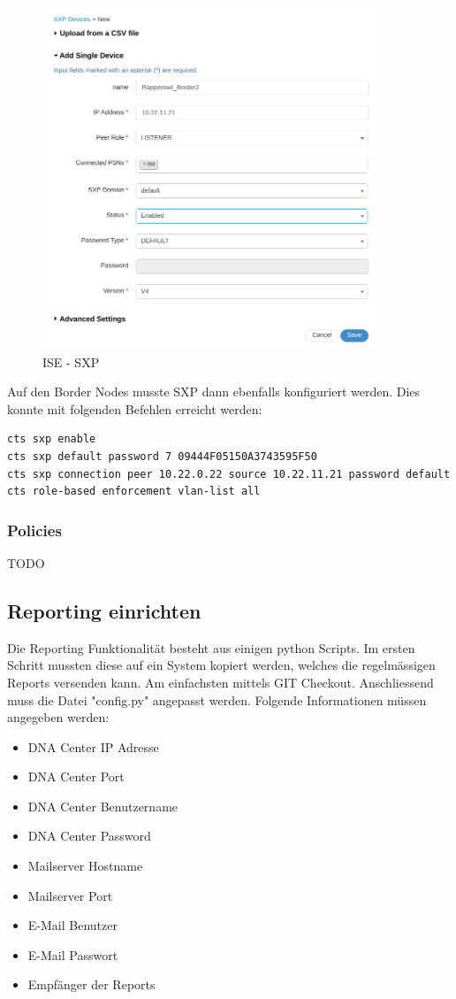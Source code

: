 \begin{figure}[H]
	\centering
	\includegraphics[width=10cm]{img/secondtry/ise-sxp.png}
	\caption{ISE - SXP}
	\label{fig:ise-sxp}
\end{figure}

Auf den Border Nodes musste SXP dann ebenfalls konfiguriert werden. Dies konnte mit folgenden Befehlen erreicht werden:
\begin{lstlisting}[language=bash]
cts sxp enable
cts sxp default password 7 09444F05150A3743595F50
cts sxp connection peer 10.22.0.22 source 10.22.11.21 password default mode local listener hold-time 0 0 vrf Mitarbeiter
cts role-based enforcement vlan-list all
\end{lstlisting}

\subsubsection{Policies}
TODO

\subsection{Reporting einrichten}

Die Reporting Funktionalität besteht aus einigen python Scripts. Im ersten Schritt mussten diese auf ein System kopiert werden, welches die regelmässigen Reports versenden kann. Am einfachsten mittels GIT Checkout.
Anschliessend muss die Datei "config.py" angepasst werden. Folgende Informationen müssen angegeben werden:
\begin{itemize}
	\item DNA Center IP Adresse
	\item DNA Center Port
	\item DNA Center Benutzername
	\item DNA Center Password
	\item Mailserver Hostname
	\item Mailserver Port
	\item E-Mail Benutzer
	\item E-Mail Passwort
	\item Empfänger der Reports
\end{itemize}


